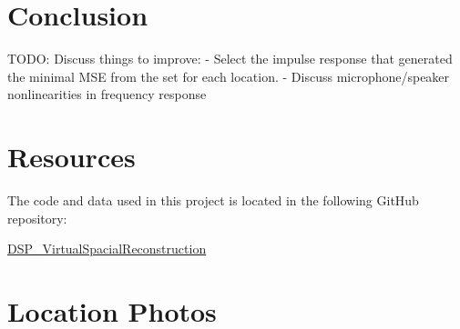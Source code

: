 \documentclass[letterpaper, 11pt, onecolumn, oneside]{article}
\begin{document}
\section{Conclusion}
TODO:
Discuss things to improve:
- Select the impulse response that generated the minimal MSE from the set for each location.
- Discuss microphone/speaker nonlinearities in frequency response

\clearpage
\begin{appendix}
\section{Resources}
\label{appendix:resources}
The code and data used in this project is located in the following GitHub repository:

\href{https://github.com/WhoFama24/DSP_VirtualSpacialReconstruction}{DSP\_VirtualSpacialReconstruction}

\section{Location Photos}
\label{appendix:locationPhotos}
%
%
%
%
\end{appendix}

\clearpage


\end{document}
